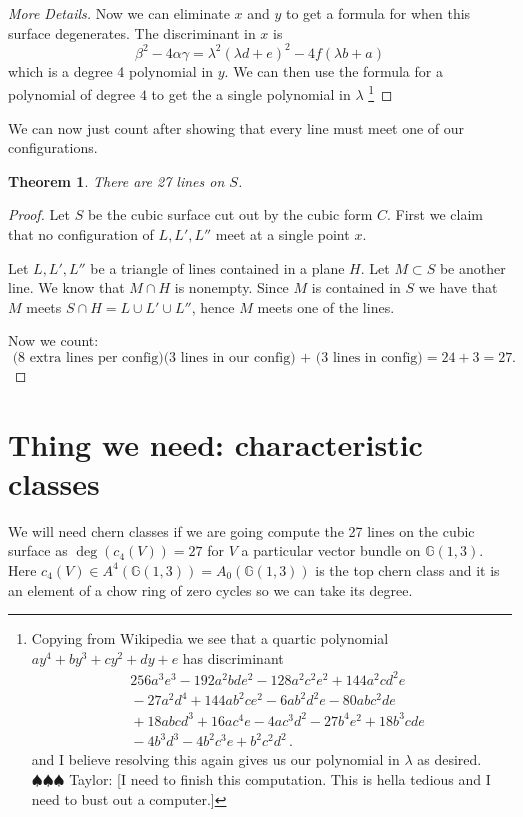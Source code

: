 \documentclass[12pt]{article}
\numberwithin{equation}{section}
\newtheorem{theorem}{Theorem}[subsection]
\theoremstyle{definition}
\theoremstyle{remark}
\newcommand{\PP}{\mathbb{P}}
\newcommand{\mult}{\operatorname{mult}}
\newcommand{\GG}{\mathbb{G}}
\newcommand{\taylor}[1]{{\color{blue} \sf $\spadesuit\spadesuit\spadesuit$ Taylor: [#1]}}
\begin{document}
\begin{proof}[More Details]
	Now we can eliminate $x$ and $y$ to get a formula for when this surface degenerates. 
	The discriminant in $x$ is  
	$$\beta^2-4\alpha \gamma = \lambda^2(\lambda d+e)^2 - 4f(\lambda b+a)$$
	which is a degree 4 polynomial in $y$. We can then use the formula for a polynomial of degree $4$ to get the a single polynomial in $\lambda$ \footnote{
	Copying from Wikipedia we see that a quartic polynomial
	$ay^4+by^3+cy^2+dy+e $
	has discriminant
	\begin{align*}
	{} & 256a^3e^3-192a^2bde^2-128a^2c^2e^2+144a^2cd^2e \\
	& {} -27a^2d^4+144ab^2ce^2-6ab^2d^2e-80abc^2de \\
	& {} +18abcd^3+16ac^4e-4ac^3d^2-27b^4e^2+18b^3cde \\
	& {} -4b^3d^3-4b^2c^3e+b^2c^2d^2\,.
	\end{align*} 
	and I believe resolving this again gives us our polynomial in $\lambda$ as desired.
	\taylor{I need to finish this computation.
	This is hella tedious and I need to bust out a computer.}
}
\end{proof}

We can now just count after showing that every line must meet one of our configurations.
\begin{theorem}
	There are 27 lines on $S$.
\end{theorem}
\begin{proof}
Let $S$ be the cubic surface cut out by the cubic form $C$. 
First we claim that no configuration of $L,L',L''$ meet at a single point $x$. 

	
Let $L,L',L''$ be a triangle of lines contained in a plane $H$. 
Let $M \subset S$ be another line.
We know that $M\cap H$ is nonempty. 
Since $M$ is contained in $S$ we have that $M$ meets $S\cap H = L\cup L' \cup L''$, hence $M$ meets one of the lines.

Now we count: 
 $$ \mbox{ ($8$ extra lines per config)($3$ lines in our config) + ($3$ lines in config)$=24+3=27$}.$$
\end{proof}

\section{Thing we need: characteristic classes}
We will need chern classes if we are going compute the 27 lines on the cubic surface as $\deg(c_4(V))=27$ for $V$ a particular vector bundle on $\GG(1,3)$. 
Here $c_4(V) \in A^4(\GG(1,3))=A_0(\GG(1,3))$ is the top chern class and it is an element of a chow ring of zero cycles so we can take its degree.
\end{document}
